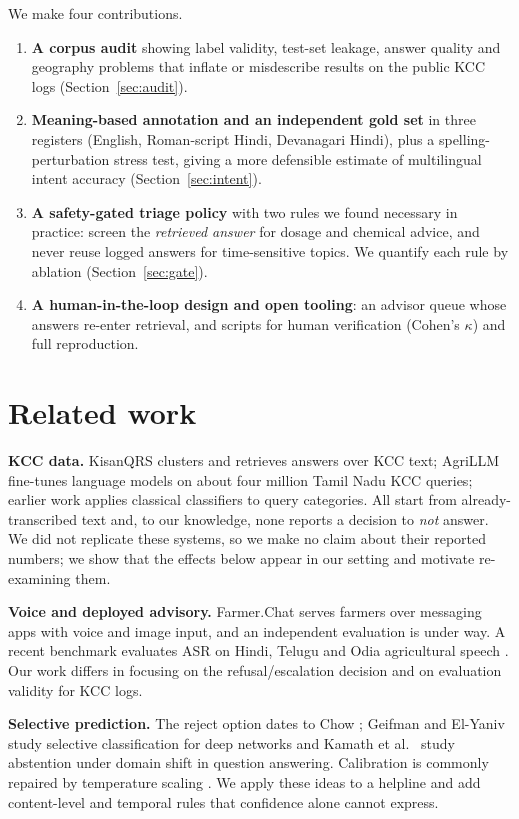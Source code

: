 \documentclass[11pt]{article}
\begin{document}
We make four contributions.
\begin{enumerate}
\item \textbf{A corpus audit} showing label validity, test-set leakage, answer quality and geography problems that inflate or misdescribe results on the public KCC logs (Section~\ref{sec:audit}).
\item \textbf{Meaning-based annotation and an independent gold set} in three registers (English, Roman-script Hindi, Devanagari Hindi), plus a spelling-perturbation stress test, giving a more defensible estimate of multilingual intent accuracy (Section~\ref{sec:intent}).
\item \textbf{A safety-gated triage policy} with two rules we found necessary in practice: screen the \emph{retrieved answer} for dosage and chemical advice, and never reuse logged answers for time-sensitive topics. We quantify each rule by ablation (Section~\ref{sec:gate}).
\item \textbf{A human-in-the-loop design and open tooling}: an advisor queue whose answers re-enter retrieval, and scripts for human verification (Cohen's $\kappa$) and full reproduction.
\end{enumerate}

\section{Related work}
\textbf{KCC data.} KisanQRS \cite{kisanqrs} clusters and retrieves answers over KCC text; AgriLLM \cite{agrillm} fine-tunes language models on about four million Tamil Nadu KCC queries; earlier work applies classical classifiers to query categories. All start from already-transcribed text and, to our knowledge, none reports a decision to \emph{not} answer. We did not replicate these systems, so we make no claim about their reported numbers; we show that the effects below appear in our setting and motivate re-examining them.

\textbf{Voice and deployed advisory.} Farmer.Chat \cite{farmerchat} serves farmers over messaging apps with voice and image input, and an independent evaluation is under way. A recent benchmark evaluates ASR on Hindi, Telugu and Odia agricultural speech \cite{agriasr}. Our work differs in focusing on the refusal/escalation decision and on evaluation validity for KCC logs.

\textbf{Selective prediction.} The reject option dates to Chow \cite{chow}; Geifman and El-Yaniv \cite{geifman} study selective classification for deep networks and Kamath et al.\ \cite{kamath} study abstention under domain shift in question answering. Calibration is commonly repaired by temperature scaling \cite{guo}. We apply these ideas to a helpline and add content-level and temporal rules that confidence alone cannot express.
\end{document}
